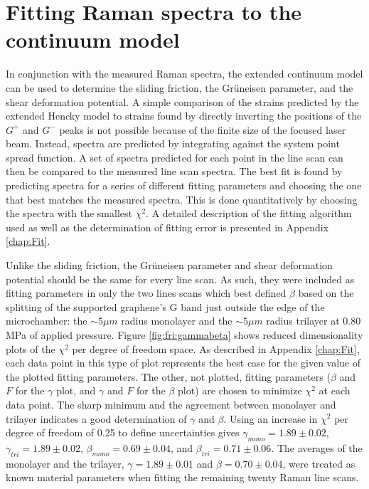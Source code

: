 \section{Fitting Raman spectra to the continuum model}
In conjunction with the measured Raman spectra, the extended continuum model can be used to determine the sliding friction, the Gr\"{u}neisen parameter, and the shear deformation potential.
A simple comparison of the strains predicted by the extended Hencky model to strains found by directly inverting the positions of the $G^+$ and $G^-$ peaks is not possible because of the finite size of the focused laser beam.
Instead, spectra are predicted by integrating against the system point spread function.
A set of spectra predicted for each point in the line scan can then be compared to the measured line scan spectra.
The best fit is found by predicting spectra for a series of different fitting parameters and choosing the one that best matches the measured spectra.
This is done quantitatively by choosing the spectra with the smallest $\chi^2$.
A detailed description of the fitting algorithm used as well as the determination of fitting error is presented in Appendix \ref{chap:Fit}.

Unlike the sliding friction, the Gr\"{u}neisen parameter and shear deformation potential should be the same for every line scan.
As such, they were included as fitting parameters in only the two lines scans which best defined $\beta$ based on the splitting of the supported graphene's G band just outside the edge of the microchamber: the $\sim 5 \mu m$ radius monolayer and the $\sim 5 \mu m$ radius trilayer at 0.80 MPa of applied pressure.
Figure \ref{fig:fri:gammabeta} shows reduced dimensionality plots of the $\chi^2$ per degree of freedom space.
As described in Appendix \ref{chap:Fit}, each data point in this type of plot represents the best case for the given value of the plotted fitting parameters.
The other, not plotted, fitting parameters ($\beta$ and $F$ for the $\gamma$ plot, and $\gamma$ and $F$ for the $\beta$ plot) are chosen to minimize $\chi^2$ at each data point.
The sharp minimum and the agreement between monolayer and trilayer indicates a good determination of $\gamma$ and $\beta$.
Using an increase in $\chi^2$ per degree of freedom of 0.25 to define uncertainties gives $\gamma_{mono} = 1.89 \pm 0.02$, $\gamma_{tri} = 1.89 \pm 0.02$, $\beta_{mono} = 0.69 \pm 0.04$, and $\beta_{tri} = 0.71 \pm 0.06$.
The averages of the monolayer and the trilayer, $\gamma=1.89 \pm 0.01$ and $\beta= 0.70 \pm 0.04$, were treated as known material parameters when fitting the remaining twenty Raman line scans.

